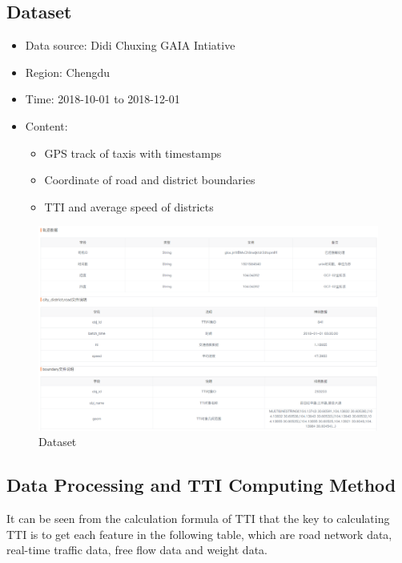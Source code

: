 \documentclass[fontset=none]{ctexart}
\theoremstyle{definition}
\theoremstyle{remark}
\begin{document}
\subsection{Dataset}
\begin{itemize}
    \item Data source: Didi Chuxing GAIA Intiative
    \item Region: Chengdu
    \item Time: 2018-10-01 to 2018-12-01
    \item Content:
        \begin{itemize}
            \item GPS track of taxis with timestamps
            \item Coordinate of road and district boundaries
            \item TTI and average speed of districts
        \end{itemize}
\end{itemize}
\begin{figure}[htb]
  \centering
  \includegraphics[width=\textwidth]{images/chengdudata.png}
  \caption{Dataset}
  \label{fig: ttidata}
\end{figure}

\subsection{Data Processing and TTI Computing Method}
It can be seen from the calculation formula of TTI that the key to calculating TTI is to get each feature in the following table, which are road network data, real-time traffic data, free flow data and weight data.
\end{document}
